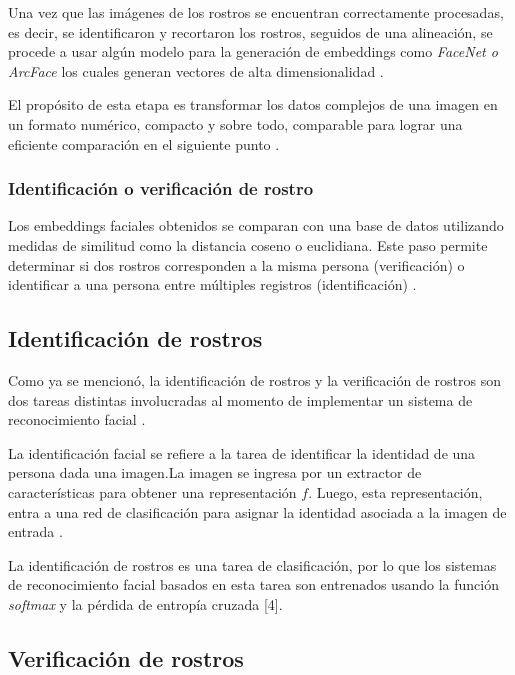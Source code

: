 Una vez que las imágenes de los rostros se encuentran correctamente procesadas, es decir, se identificaron y recortaron los rostros, seguidos de una alineación, se procede a usar algún modelo para la generación de embeddings como \textit{FaceNet o ArcFace} los cuales generan vectores de alta dimensionalidad \cite{Face_OpenCV}.

El propósito de esta etapa es transformar los datos complejos de una imagen en un formato numérico, compacto y sobre todo, comparable para lograr una eficiente comparación en el siguiente punto \cite{L16}.


\subsubsection{Identificación o verificación de rostro}

Los embeddings faciales obtenidos se comparan con una base de datos utilizando medidas de similitud como la distancia coseno o euclidiana. Este paso permite determinar si dos rostros corresponden a la misma persona (verificación) o identificar a una persona entre múltiples registros (identificación) \cite{L14}.



\subsection{Identificación de rostros}

Como ya se mencionó, la identificación de rostros y la verificación de rostros son dos tareas distintas involucradas al momento de implementar un sistema de reconocimiento facial \cite{L14}.

La identificación facial se refiere a la tarea de identificar la identidad de una persona dada una imagen.La imagen se ingresa por un extractor de características para obtener una representación $f$. Luego, esta representación, entra a una red de clasificación para asignar la identidad asociada a la imagen de entrada \cite{L15}.

La identificación de rostros es una tarea de clasificación, por lo que los sistemas de reconocimiento facial basados en esta tarea son entrenados usando la función \textit{softmax} y la pérdida de entropía cruzada [4].

\subsection{Verificación de rostros}


